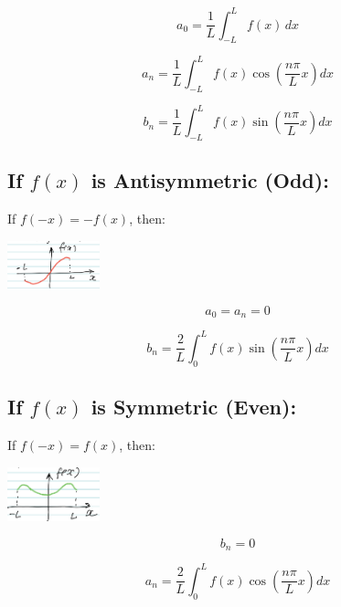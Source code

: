 \documentclass[a4paper,12pt]{article}
\begin{document}
\begin{equation*}
    a_0 = \frac{1}{L} \int_{-L}^{L} f(x)\,dx
\end{equation*}

\begin{equation*}
    a_n = \frac{1}{L} \int_{-L}^{L} f(x) \cos\left(\frac{n \pi}{L} x\right) dx
\end{equation*}

\begin{equation*}
    b_n = \frac{1}{L} \int_{-L}^{L} f(x) \sin\left(\frac{n \pi}{L} x\right) dx
\end{equation*}

\subsection*{If $f(x)$ is Antisymmetric (Odd):}
If $f(-x) = -f(x)$, then:
\begin{center}
\includegraphics[width=0.2\textwidth]{Bilder/1.png}
\end{center}
\begin{equation*}
    a_0 = a_n = 0 
\end{equation*}

\begin{equation*}
    b_n = \frac{2}{L} \int_{0}^{L} f(x) \sin\left(\frac{n \pi}{L} x\right) dx
\end{equation*}

\subsection*{If $f(x)$ is Symmetric (Even):}
If $f(-x) = f(x)$, then:
\begin{center}
\includegraphics[width=0.2\textwidth]{Bilder/2.png}
\end{center}
\begin{equation*}
    b_n = 0
\end{equation*}

\begin{equation*}
    a_n = \frac{2}{L} \int_{0}^{L} f(x) \cos\left(\frac{n \pi}{L} x\right) dx
\end{equation*}
\end{document}
